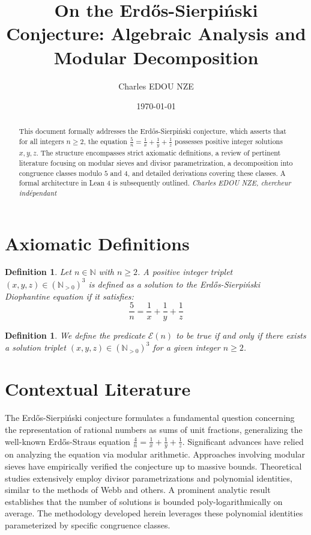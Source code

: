 \documentclass[12pt, a4paper]{article}
\title{On the Erd\H{o}s-Sierpi\'nski Conjecture: Algebraic Analysis and Modular Decomposition}
\author{Charles EDOU NZE}
\date{\today}
\newtheorem{definition}[theorem]{Definition}
\begin{document}
\maketitle
\thispagestyle{empty}


\begin{abstract}
This document formally addresses the Erd\H{o}s-Sierpi\'nski conjecture, which asserts that for all integers $n \ge 2$, the equation $\frac{5}{n} = \frac{1}{x} + \frac{1}{y} + \frac{1}{z}$ possesses positive integer solutions $x, y, z$. The structure encompasses strict axiomatic definitions, a review of pertinent literature focusing on modular sieves and divisor parametrization, a decomposition into congruence classes modulo $5$ and $4$, and detailed derivations covering these classes. A formal architecture in Lean 4 is subsequently outlined.
\vfill
\noindent \textit{Charles EDOU NZE, chercheur ind\'ependant}
\end{abstract}

\tableofcontents
\newpage

\section{Axiomatic Definitions}

\begin{definition}
Let $n \in \mathbb{N}$ with $n \ge 2$. A positive integer triplet $(x, y, z) \in (\mathbb{N}_{>0})^3$ is defined as a solution to the Erd\H{o}s-Sierpi\'nski Diophantine equation if it satisfies:
\[ \frac{5}{n} = \frac{1}{x} + \frac{1}{y} + \frac{1}{z} \]
\end{definition}

\begin{definition}
We define the predicate $\mathcal{E}(n)$ to be true if and only if there exists a solution triplet $(x, y, z) \in (\mathbb{N}_{>0})^3$ for a given integer $n \ge 2$.
\end{definition}

\section{Contextual Literature}

The Erd\H{o}s-Sierpi\'nski conjecture formulates a fundamental question concerning the representation of rational numbers as sums of unit fractions, generalizing the well-known Erd\H{o}s-Straus equation $\frac{4}{n} = \frac{1}{x} + \frac{1}{y} + \frac{1}{z}$. Significant advances have relied on analyzing the equation via modular arithmetic. Approaches involving modular sieves have empirically verified the conjecture up to massive bounds. Theoretical studies extensively employ divisor parametrizations and polynomial identities, similar to the methods of Webb and others. A prominent analytic result establishes that the number of solutions is bounded poly-logarithmically on average. The methodology developed herein leverages these polynomial identities parameterized by specific congruence classes.
\end{document}
